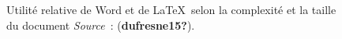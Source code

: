 \documentclass[
  letterpaper,
  DIV=11,
  numbers=noendperiod]{scrreprt}
\begin{document}
\begin{figure}


\caption{\label{fig-latex-vs-word}Utilité relative de Word et de
\LaTeX~selon la complexité et la taille du document
\newline \textit{Source}~: (\textbf{dufresne15?}).}

\end{figure}%
\end{document}

